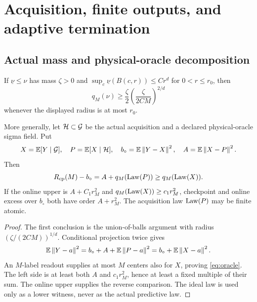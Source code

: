 \section{Acquisition, finite outputs, and adaptive termination}\label{sec:acquisition}
\subsection{Actual mass and physical-oracle decomposition}
\begin{proposition}\label{prop:acquired}
If $\underline\nu\le\nu$ has mass $\zeta>0$ and
$\sup_c\underline\nu(B(c,r))\le C r^d$ for $0<r\le r_0$, then
\begin{equation}\label{eq:masslower}
 q_M(\nu)\ge\frac\zeta2\left(\frac\zeta{2CM}\right)^{2/d}
\end{equation}
whenever the displayed radius is at most $r_0$.

More generally, let $\mathcal H\subset\mathcal G$ be the actual acquisition and a declared physical-oracle sigma field. Put
\[
 X=\mathbb E[Y\mid\mathcal G],\quad P=\mathbb E[X\mid\mathcal H],\quad
 b_\circ=\mathbb E\left\lVert Y-X\right\rVert^2,\quad A=\mathbb E\left\lVert X-P\right\rVert^2.
\]
Then
\begin{equation}\label{eq:oracle}
 R_{\mathrm{cp}}(M)-b_\circ=A+q_M(\operatorname{Law}(P))\ge q_M(\operatorname{Law}(X)).
\end{equation}
If the online upper is $A+C_1r_M^2$ and $q_M(\operatorname{Law}(X))\ge c_1r_M^2$, checkpoint and online excess over $b_\circ$ both have order $A+r_M^2$. The acquisition law $\operatorname{Law}(P)$ may be finite atomic.
\end{proposition}
\begin{proof}
The first conclusion is the union-of-balls argument with radius $(\zeta/(2CM))^{1/d}$. Conditional projection twice gives
\[
 \mathbb E\left\lVert Y-a\right\rVert^2=b_\circ+A+\mathbb E\left\lVert P-a\right\rVert^2
              =b_\circ+\mathbb E\left\lVert X-a\right\rVert^2.
\]
An $M$-label readout supplies at most $M$ centers also for $X$, proving \eqref{eq:oracle}. The left side is at least both $A$ and $c_1r_M^2$, hence at least a fixed multiple of their sum. The online upper supplies the reverse comparison. The ideal law is used only as a lower witness, never as the actual predictive law.
\end{proof}


